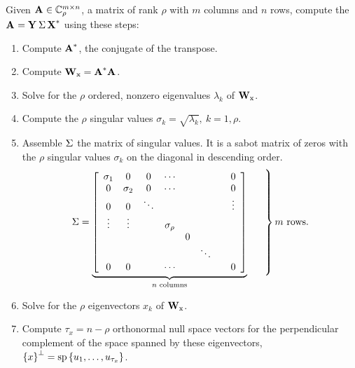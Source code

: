 \clearpage
\break
\begin{table}[h]
Given $\textbf{A}^{\mathrm{}}\in\mathbb{C}^{m \times n}_{\rho}$, a matrix of rank $\rho$ with $m$ columns and $n$ rows, compute the \svdl \ $\textbf{A}^{\mathrm{}}=\textbf{Y}^{\mathrm{}}\,\Sigma\,\textbf{X}^{\mathrm{*}}$ using these steps:\\[4pt]
\begin{enumerate}
\item Compute $\textbf{A}^{\mathrm{*}}$, the conjugate of the transpose.\\[4pt]
\item Compute $\textbf{W}_{\mathrm{x}}=\textbf{A}^{\mathrm{ \mathrm{*} }}\textbf{A}^{\mathrm{}}$.\\[4pt]
\item Solve for the $\rho$ ordered, nonzero eigenvalues $\lambda_{k}$ of $\textbf{W}_{\mathrm{x}}$.\\[4pt]
\item Compute the $\rho$ singular values $\sigma_{k}=\sqrt{\lambda_{k}}, \ k=1,\rho$.\\[4pt]
\item Assemble $\Sigma^{\mathrm{}}$ the matrix of singular values. It is a sabot matrix of zeros with the $\rho$ singular values $\sigma_{k}$ on the diagonal in descending order.
\begin{equation}
  \Sigma = \underbrace{\mat{cccccccc}
  {
  \sigma_{1} & 0 & 0 & \cdots &&&& 0\\
  0 & \sigma_{2} & 0 & \dotsm &&&& 0\\
  0 & 0 & \ddots &&&&& \vdots \\
  \vdots & \vdots & & \sigma_{\rho} \\
   &  & & & 0  \\
   &  & & & & \ddots  \\
  0 & 0 &  & \cdots &&&& 0
  }}_{n \text{ columns}}
  \left. \phantom{\begin{array}{l}
  1\\
  1\\
  1\\
  1\\
  1\\
  1\\
  1\\
  1\\
  1
  \end{array}}\right\}
  m\text{ rows}.
\end{equation}
\item Solve for the $\rho$ eigenvectors $x_{k}$ of $\textbf{W}_{\mathrm{x}}$.\\[4pt]
\item Compute $\tau_{x}=n-\rho$ orthonormal null space vectors for the perpendicular complement of the space spanned by these eigenvectors, $\left\{ x \right\}^{\perp}=\operatorname{sp}\left\{ u_{1},\dots,u_{\tau_{x}} \right\}$.\\[4pt]

\end{enumerate}
\end{table}
